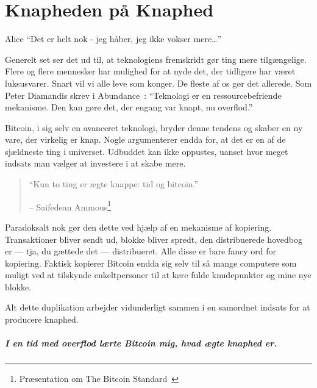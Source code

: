 
\chapter{Knapheden på Knaphed}
\label{les:2}

\begin{chapquote}{Alice}
\enquote{Det er helt nok - jeg håber, jeg ikke vokser mere\ldots}
\end{chapquote}

Generelt set ser det ud til, at teknologiens fremskridt gør ting mere tilgængelige. Flere og flere mennesker har mulighed for at nyde det, der tidligere har været luksusvarer. Snart vil vi alle leve som konger. De fleste af os gør det allerede. Som Peter Diamandis skrev i Abundance~\cite{abundance}: \enquote{Teknologi er en ressourcebefriende mekanisme. Den kan gøre det, der engang var knapt, nu overflod.}

Bitcoin, i sig selv en avanceret teknologi, bryder denne tendens og skaber en ny vare, der virkelig er knap. Nogle argumenterer endda for, at det er en af de sjældneste ting i universet. Udbuddet kan ikke oppustes, uanset hvor meget indsats man vælger at investere i at skabe mere.

\begin{quotation}\begin{samepage}
\enquote{Kun to ting er ægte knappe: tid og bitcoin.}
\begin{flushright} -- Saifedean Ammous\footnote{Præsentation om The Bitcoin Standard~\cite{bitcoinstandard-pres}}
\end{flushright}\end{samepage}\end{quotation}

Paradoksalt nok gør den dette ved hjælp af en mekanisme af kopiering. Transaktioner bliver sendt ud, blokke bliver spredt, den distribuerede hovedbog er --- tja, du gættede det --- distribueret. Alle disse er bare fancy ord for kopiering. Faktisk kopierer Bitcoin endda sig selv til så mange computere som muligt ved at tilskynde enkeltpersoner til at køre fulde knudepunkter og mine nye blokke.

Alt dette duplikation arbejder vidunderligt sammen i en samordnet indsats for at producere knaphed.

\paragraph{I en tid med overflod lærte Bitcoin mig, hvad ægte knaphed er.}

